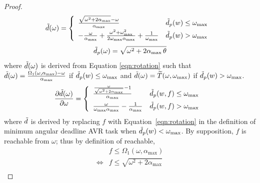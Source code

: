 \begin{proof}
\begin{equation}
\Tilde{d}(\omega) =
\left\{
    \def\arraystretch{1.5}
    \begin{array}{ll}
        \frac{\sqrt{\omega^2+2\alpha_{\max}}-\omega}{\alpha_{\max}} & \Tilde{d}_p(w) \leq \omega_{\max} \ \\
        -\frac{\omega}{\alpha_{\max}} + \frac{\omega^2 + \omega_{\max}^2}{2\omega_{\max}\alpha_{\max}}+\frac{1}{\omega_{\max}}  & \Tilde{d}_p(w) > \omega_{\max}
    \end{array}
\right.
\end{equation}
\begin{equation}
\Tilde{d}_p(\omega) = \sqrt{\omega^2 + 2\alpha_{\max}\, \theta}
\end{equation}
where $\Tilde{d}(\omega)$ is derived from Equation \ref{eqn:rotation} such that $\Tilde{d}(\omega) = \frac{\Omega_1(\omega,\alpha_{\max}) - \omega}{\alpha_{\max}}$ if $\Tilde{d}_p(w) \leq \omega_{\max}$ and $\Tilde{d}(\omega) = \widetilde{T}(\omega,\omega_{\max})$ if $\Tilde{d}_p(w) > \omega_{\max}$.
\begin{equation} \label{eq:minTimeFinalJobDerivative}
\frac{\partial  \Tilde{d}(\omega)}{\partial \omega} =
\left\{
    \def\arraystretch{1.5}
    \begin{array}{ll}
        \frac{\frac{\omega}{\sqrt{\omega^2+2\alpha_{\max}}}-1}{\alpha_{\max}} & \Tilde{d}_p(w,f) \leq \omega_{\max} \ \\
        \frac{\omega}{\omega_{\max}\alpha_{\max}} - \frac{1}{\alpha_{\max}}  & \Tilde{d}_p(w,f) > \omega_{\max}
    \end{array}
\right.
\end{equation}
where $\Tilde{d}$ is derived by replacing $f$ with Equation~\ref{eqn:rotation} in the definition of minimum angular deadline AVR task when $\Tilde{d}_p(w) < \omega_{\max}$.
By supposition, $f$ is reachable from $\omega$; thus by definition of reachable,
\begin{equation} \label{eq:partialEpartialwCompare}
\begin{array}{ll}
          { } & f  \leq  \Omega_1(\omega, \alpha_{\max})\nonumber\\
    \Leftrightarrow & f  \leq  \sqrt{\omega^2+2\alpha_{\max}} \nonumber \\

\end{array}
\end{equation}
\end{proof}
